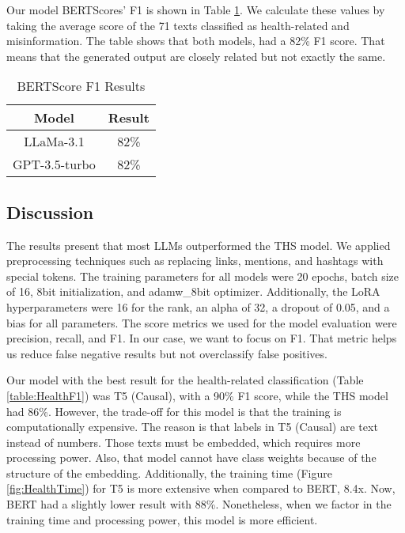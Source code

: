 Our model BERTScores'  F1 is shown in Table \ref{table:BERTScore}. We calculate these values by taking the average score of the 71 texts classified as health-related and misinformation. The table shows that both models, had a 82\% F1 score. That means that the generated output are closely related but not exactly the same. 

\begin{table}[H]
	\centering
	\caption{BERTScore F1 Results}
	\begin{tabular}{||c | c||} 
		\hline
		\textbf{Model} & \textbf{Result} \\ [0.5ex] 
		\hline
		LLaMa-3.1 & 82\%  \\
		\hline
		GPT-3.5-turbo & 82\% \\ 		
		\hline
		\end{tabular}
	\label{table:BERTScore}
\end{table}

\subsection{Discussion}

The results present that most LLMs outperformed the THS model. We applied preprocessing techniques such as replacing links, mentions, and hashtags with special tokens. The training
parameters for all models were 20 epochs, batch size of 16, 8bit initialization, and adamw\_8bit optimizer. Additionally, the LoRA hyperparameters were 16 for the rank, an alpha of 32, a dropout
of 0.05, and a bias for all parameters. The score metrics we used for the model evaluation were precision, recall, and F1. In our case, we want to focus on F1. That metric helps us reduce false
negative results but not overclassify false positives.

Our model with the best result for the health-related classification (Table \ref{table:HealthF1}) was T5 (Causal), with a 90\% F1 score, while the THS model had 86\%. However, the trade-off
for this model is that the training is computationally expensive. The reason is that labels in T5 (Causal) are text instead of numbers. Those texts must be embedded, which requires more
processing power. Also, that model cannot have class weights because of the structure of the embedding. Additionally, the training time (Figure \ref{fig:HealthTime}) for T5 is more extensive
when compared to BERT, 8.4x. Now, BERT had a slightly lower result with 88\%. Nonetheless, when we factor in the training time and processing power, this model is more efficient.

